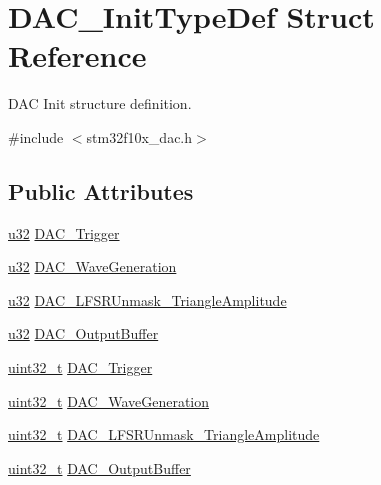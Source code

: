 \hypertarget{struct_d_a_c___init_type_def}{}\section{D\+A\+C\+\_\+\+Init\+Type\+Def Struct Reference}
\label{struct_d_a_c___init_type_def}


D\+AC Init structure definition.  




{\ttfamily \#include $<$stm32f10x\+\_\+dac.\+h$>$}

\subsection*{Public Attributes}
\begin{DoxyCompactItemize}
\item 
\hyperlink{agilefox_2library_2inc_2stm32f10x__type_8h_a2caf5cd7bcdbe1eefa727f44ffb10bac}{u32} \hyperlink{struct_d_a_c___init_type_def_a795b4b118c54c233afe81237a886817d}{D\+A\+C\+\_\+\+Trigger}
\item 
\hyperlink{agilefox_2library_2inc_2stm32f10x__type_8h_a2caf5cd7bcdbe1eefa727f44ffb10bac}{u32} \hyperlink{struct_d_a_c___init_type_def_ab0d24eb6e14decf7e5df35412dcc028a}{D\+A\+C\+\_\+\+Wave\+Generation}
\item 
\hyperlink{agilefox_2library_2inc_2stm32f10x__type_8h_a2caf5cd7bcdbe1eefa727f44ffb10bac}{u32} \hyperlink{struct_d_a_c___init_type_def_a018347caf971cb4dbd161550cd62f5b8}{D\+A\+C\+\_\+\+L\+F\+S\+R\+Unmask\+\_\+\+Triangle\+Amplitude}
\item 
\hyperlink{agilefox_2library_2inc_2stm32f10x__type_8h_a2caf5cd7bcdbe1eefa727f44ffb10bac}{u32} \hyperlink{struct_d_a_c___init_type_def_a3d7a53937aa3af44848927cffb119a6f}{D\+A\+C\+\_\+\+Output\+Buffer}
\item 
\hyperlink{_p_e___types_8h_a33594304e786b158f3fb30289278f5af}{uint32\+\_\+t} \hyperlink{struct_d_a_c___init_type_def_a7b26ebaeb51a0157a781f7de8ba779e5}{D\+A\+C\+\_\+\+Trigger}
\item 
\hyperlink{_p_e___types_8h_a33594304e786b158f3fb30289278f5af}{uint32\+\_\+t} \hyperlink{struct_d_a_c___init_type_def_a6753e78ddd2dc8273444ba01a272d63a}{D\+A\+C\+\_\+\+Wave\+Generation}
\item 
\hyperlink{_p_e___types_8h_a33594304e786b158f3fb30289278f5af}{uint32\+\_\+t} \hyperlink{struct_d_a_c___init_type_def_a27ed27a544d50781b20d59cc55e6cef8}{D\+A\+C\+\_\+\+L\+F\+S\+R\+Unmask\+\_\+\+Triangle\+Amplitude}
\item 
\hyperlink{_p_e___types_8h_a33594304e786b158f3fb30289278f5af}{uint32\+\_\+t} \hyperlink{struct_d_a_c___init_type_def_ad3e9e01486443e99f19e65a446b03ca6}{D\+A\+C\+\_\+\+Output\+Buffer}
\end{DoxyCompactItemize}


